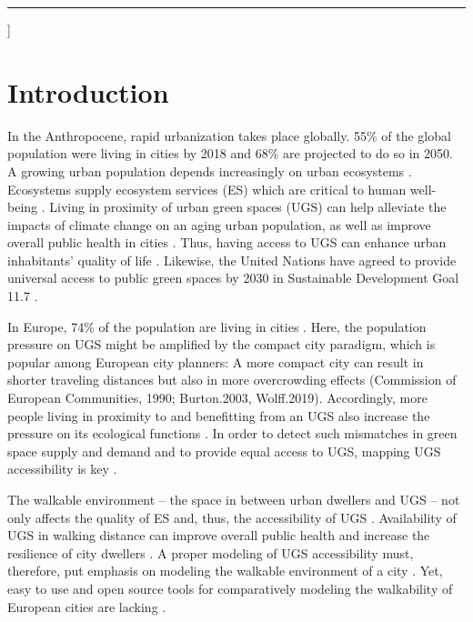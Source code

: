 \documentclass[10pt]{article}
\begin{document}
\vspace*{.5cm}

\hrule

\par\vspace{2ex}]

\vspace{.5cm}

\normalsize


\section{Introduction}
In the Anthropocene, rapid urbanization takes place globally. 55\% of the global population were living in cities by 2018 and 68\% are projected to do so in 2050.
A growing urban population depends increasingly on urban ecosystems \citep{Elmqvist.2021, UN.2019}.
Ecosystems supply ecosystem services (ES) which are critical to human well-being \citep{Fisher.2009}.
Living in proximity of urban green spaces (UGS) can help alleviate the impacts of climate change on an aging urban population, as well as improve overall public health in cities \citep{Kabisch.2021, Kabisch.2021b}.
Thus, having access to UGS can enhance urban inhabitants’ quality of life \citep{Poelman.2018}.
Likewise, the United Nations have agreed to provide universal access to public green spaces by 2030 in Sustainable Development Goal 11.7 \citep{UN.2017}.

In Europe, 74\% of the population are living in cities \citep{UN.2019}.
Here, the population pressure on UGS might be amplified by the compact city paradigm, which is popular among European city planners: A more compact city can result in shorter traveling distances but also in more overcrowding effects (Commission of European Communities, 1990; Burton.2003, Wolff.2019).
Accordingly, more people living in proximity to and benefitting from an UGS also increase the pressure on its ecological functions \citep{Wolff.2019}.
In order to detect such mismatches in green space supply and demand and to provide equal access to UGS, mapping UGS accessibility is key \citep{Larondelle.2013}.

The walkable environment – the space in between urban dwellers and UGS – not only affects the quality of ES and, thus, the accessibility of UGS \citep{Syrbe.2012}.
Availability of UGS in walking distance can improve overall public health and increase the resilience of city dwellers \citep{Kabisch.2021,Richardson.2013}.
A proper modeling of UGS accessibility must, therefore, put emphasis on modeling the walkable environment of a city \citep{Wolff.2019}.
Yet, easy to use and open source tools for comparatively modeling the walkability of European cities are lacking \citep{Kabisch.2016}.
\end{document}
